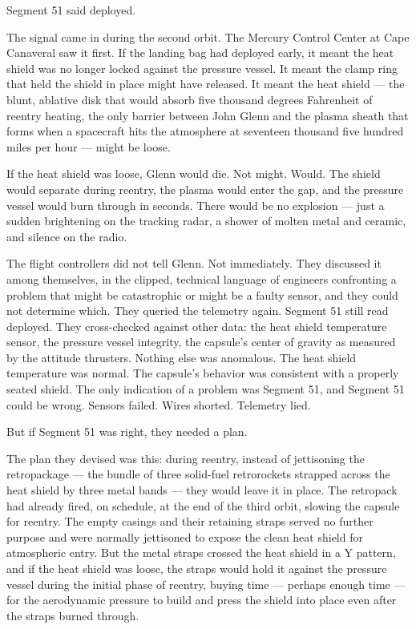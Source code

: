 \documentclass[12pt, letterpaper]{article}
\begin{document}
Segment 51 said deployed.

The signal came in during the second orbit. The Mercury Control Center at Cape Canaveral saw it first. If the landing bag had deployed early, it meant the heat shield was no longer locked against the pressure vessel. It meant the clamp ring that held the shield in place might have released. It meant the heat shield --- the blunt, ablative disk that would absorb five thousand degrees Fahrenheit of reentry heating, the only barrier between John Glenn and the plasma sheath that forms when a spacecraft hits the atmosphere at seventeen thousand five hundred miles per hour --- might be loose.

If the heat shield was loose, Glenn would die. Not might. Would. The shield would separate during reentry, the plasma would enter the gap, and the pressure vessel would burn through in seconds. There would be no explosion --- just a sudden brightening on the tracking radar, a shower of molten metal and ceramic, and silence on the radio.

The flight controllers did not tell Glenn. Not immediately. They discussed it among themselves, in the clipped, technical language of engineers confronting a problem that might be catastrophic or might be a faulty sensor, and they could not determine which. They queried the telemetry again. Segment 51 still read deployed. They cross-checked against other data: the heat shield temperature sensor, the pressure vessel integrity, the capsule's center of gravity as measured by the attitude thrusters. Nothing else was anomalous. The heat shield temperature was normal. The capsule's behavior was consistent with a properly seated shield. The only indication of a problem was Segment 51, and Segment 51 could be wrong. Sensors failed. Wires shorted. Telemetry lied.

But if Segment 51 was right, they needed a plan.

The plan they devised was this: during reentry, instead of jettisoning the retropackage --- the bundle of three solid-fuel retrorockets strapped across the heat shield by three metal bands --- they would leave it in place. The retropack had already fired, on schedule, at the end of the third orbit, slowing the capsule for reentry. The empty casings and their retaining straps served no further purpose and were normally jettisoned to expose the clean heat shield for atmospheric entry. But the metal straps crossed the heat shield in a Y pattern, and if the heat shield was loose, the straps would hold it against the pressure vessel during the initial phase of reentry, buying time --- perhaps enough time --- for the aerodynamic pressure to build and press the shield into place even after the straps burned through.
\end{document}
